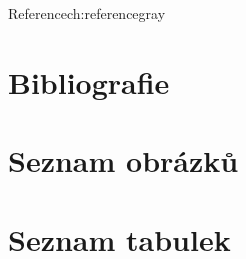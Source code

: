 \begin{chapterintro}{Reference}{ch:reference}{gray}{}
\end{chapterintro}

\section{Bibliografie}
\printbibliography

\section{Seznam obrázků}

\section{Seznam tabulek}
